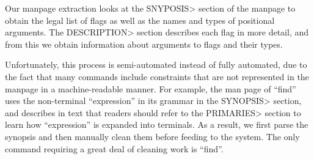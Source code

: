Our manpage extraction looks at the \<SNYPOSIS> section of the manpage to obtain
the legal list of flags as well as the names and types of positional arguments.
The \<DESCRIPTION> section describes each flag in more detail, and from this we
obtain information about arguments to flags and their types.

Unfortunately, this process is semi-automated instead of fully automated, due to
the fact that many commands include constraints that are not represented in the
manpage in a machine-readable manner. For example, the man page of ``find'' uses
the non-terminal ``expression'' in its grammar in the \<SYNOPSIS> section, and
describes in text that readers should refer to the \<PRIMARIES> section to learn
how ``expression'' is expanded into terminals. As a result, we first parse the
synopsis and then manually clean them before feeding to the system. The only
command requiring a great deal of cleaning work is ``find''.
